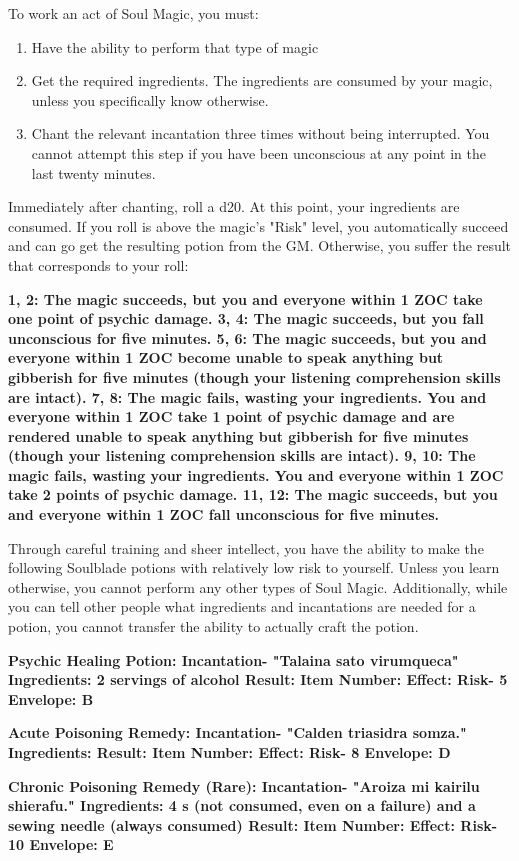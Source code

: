 \documentclass[green]{Kos}
\begin{document}
\name{\gWardSoulMagic{}}


To work an act of Soul Magic, you must:

\begin{enumerate} 
\item Have the ability to perform that type of magic
\item Get the required ingredients. The ingredients are consumed by your magic, unless you specifically know otherwise.
\item Chant the relevant incantation three times without being interrupted. You cannot attempt this step if you have been unconscious at any point in the last twenty minutes.
\end{enumerate}

Immediately after chanting, roll a d20. At this point, your ingredients are consumed. If you roll is above the magic's "Risk" level, you automatically succeed and can go get the resulting potion from the GM. Otherwise, you suffer the result that corresponds to your roll:

\bf{1, 2:} The magic succeeds, but you and everyone within 1 ZOC take one point of psychic damage.
\bf{3, 4:} The magic succeeds, but you fall unconscious for five minutes.
\bf{5, 6:} The magic succeeds, but you and everyone within 1 ZOC become unable to speak anything but gibberish for five minutes (though your listening comprehension skills are intact).
\bf{7, 8:} The magic fails, wasting your ingredients.  You and everyone within 1 ZOC take 1 point of psychic damage and are rendered unable to speak anything but gibberish for five minutes (though your listening comprehension skills are intact).
\bf{9, 10:} The magic fails, wasting your ingredients. You and everyone within 1 ZOC take 2 points of psychic damage.
\bf{11, 12:} The magic succeeds, but you and everyone within 1 ZOC fall unconscious for five minutes.

Through careful training and sheer intellect, you have the ability to make the following Soulblade potions with relatively low risk to yourself. Unless you learn otherwise, you cannot perform any other types of Soul Magic. Additionally, while you can tell other people what ingredients and incantations are needed for a potion, you cannot transfer the ability to actually craft the potion.

\bf{Psychic Healing Potion:}
Incantation- "Talaina sato virumqueca"
Ingredients: 2 servings of alcohol
Result: \iPsychicHealthRemedy{\MYname}
Item Number: \iPsychicHealthRemedy{\MYnumber}
Effect: \iPsychicHealthRemedy{\MYtext}
Risk- 5
Envelope: B


\bf{Acute Poisoning Remedy:}
Incantation- "Calden triasidra somza."
Ingredients: \iHerbs{}
Result: \iAcutePoisonRemedy{\MYname}
Item Number: \iAcutePoisonRemedy{\MYnumber}
Effect: \iAcutePoisonRemedy{\MYtext}
Risk- 8
Envelope: D

\bf{Chronic Poisoning Remedy (Rare):}
Incantation- "Aroiza mi kairilu shierafu."
Ingredients: 4 \iEmerald{\MYname}s (not consumed, even on a failure) and a sewing needle (always consumed)
Result: \iChronicPoisonRemedy{\MYname}
Item Number: \iChronicPoisonRemedy{\MYnumber}
Effect: \iChronicPoisonRemedy{\MYtext}
Risk- 10
Envelope: E
\end{document}
